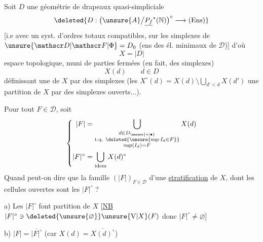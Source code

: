 Soit $D$ une géométrie de drapeaux quasi-simpliciale
\[
\deleted{D:\bigl(\unsure{A}\big/\underline{P_f}^{*}(\mathbb N)\bigr)^{\circ}\longrightarrow(\mathrm{Ens})}
\]
[i.e avec  un syst. d'ordres totaux compatibles, sur les simplexes de $\unsure{\mathscr D|\mathscr F|\Phi}=D_0$ (ens des él. minimaux de $\mathscr D$)]
d'où
\[
X=|D|
\]
espace topologique, muni de parties fermées (en fait, des simplexes)
\[
X(d)\qquad d\in D
\]
définissant une    de $X$ par des simplexes (les $X^{\circ}(d)=X(d)\setminus\bigcup_{d'<d}X(d')$  une partition de $X$ par des simplexes ouverts...).

Pour tout $F\in\mathscr D$, soit
\[
\left\{\begin{aligned}
|F|&=\bigcup_{\substack{d\in D_{\unsure{*|\bullet}}\\
\text{t.q. }\deleted{\unsure{\sup I_d\in F}}\\ \sup(I_d)=F}}X(d)\\
|F|^{\circ}&=\bigcup_{\text{idem}}X(d)^{\circ}
\end{aligned}\right.
\]
Quand peut-on dire que la famille  $(|F|)_{F\in\mathscr D}$
  d'une \uline{stratification} de $X$, dont les cellules ouvertes sont les $|F|^{\circ}$ ?

a) Les $|F|^{\circ}$  font partition de $X$
[\uline{NB} $|F|^{\circ}\ni\deleted{\unsure{\varnothing}}\unsure{\mathrm{V}|X}(F)$
 donc $|F|^{\circ}\ne\varnothing$]

b) $|F|=\overline{|F|^{\circ}}$ (car $X(d)=\overline{X(d)^{\circ}}$) 

